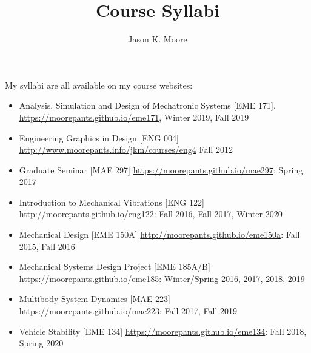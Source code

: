 \documentclass{article}
\title{Course Syllabi}
\author{Jason K. Moore}
\date{}
\begin{document}
\maketitle

My syllabi are all available on my course websites:

\begin{itemize}
  \item Analysis, Simulation and Design of Mechatronic Systems [EME 171],
    \url{https://moorepants.github.io/eme171}, Winter 2019, Fall 2019
  \item Engineering Graphics in Design [ENG 004]
    \url{http://www.moorepants.info/jkm/courses/eng4} Fall 2012
  \item Graduate Seminar [MAE 297] \url{https://moorepants.github.io/mae297}: Spring
    2017
  \item Introduction to Mechanical Vibrations [ENG 122]
    \url{http://moorepants.github.io/eng122}: Fall 2016, Fall 2017, Winter 2020
  \item Mechanical Design [EME 150A] \url{http://moorepants.github.io/eme150a}: Fall
    2015, Fall 2016
  \item Mechanical Systems Design Project [EME 185A/B]
    \url{https://moorepants.github.io/eme185}: Winter/Spring 2016, 2017, 2018, 2019
  \item Multibody System Dynamics [MAE 223]
    \url{https://moorepants.github.io/mae223}: Fall 2017, Fall 2019
  \item Vehicle Stability [EME 134] \url{https://moorepants.github.io/eme134}:
    Fall 2018, Spring 2020
\end{itemize}
\end{document}
